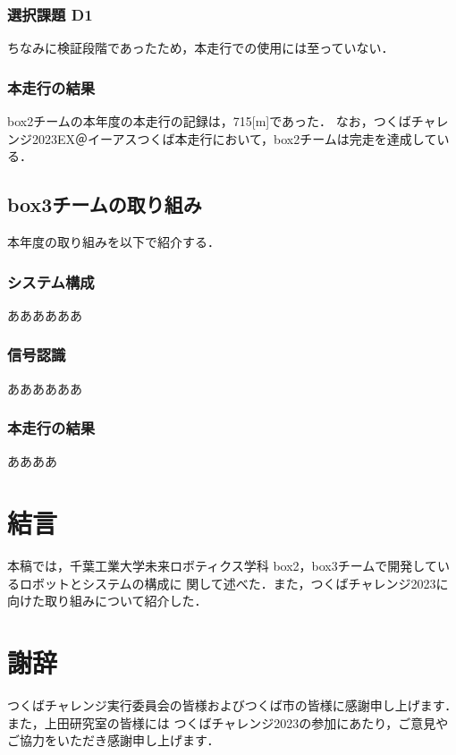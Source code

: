 \documentclass[twocolumn, 9pt]{jsproceedings}
\begin{document}
\subsubsection{選択課題 D1}
ちなみに検証段階であったため，本走行での使用には至っていない．

\subsubsection{本走行の結果}
box2チームの本年度の本走行の記録は，715[m]であった．
なお，つくばチャレンジ2023EX＠イーアスつくば本走行において，box2チームは完走を達成している．

\subsection{box3チームの取り組み}
本年度の取り組みを以下で紹介する．

\subsubsection{システム構成}
ああああああ

\subsubsection{信号認識}
ああああああ

\subsubsection{本走行の結果}
ああああ



\section{結言}
本稿では，千葉工業大学未来ロボティクス学科 box2，box3チームで開発しているロボットとシステムの構成に
関して述べた．また，つくばチャレンジ2023に向けた取り組みについて紹介した．\\

\section*{謝辞}
つくばチャレンジ実行委員会の皆様およびつくば市の皆様に感謝申し上げます．また，上田研究室の皆様には
つくばチャレンジ2023の参加にあたり，ご意見やご協力をいただき感謝申し上げます．\\
\end{document}
